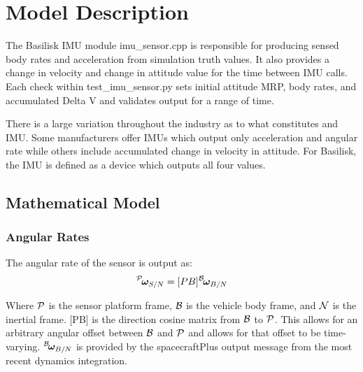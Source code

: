 \section{Model Description}
The Basilisk IMU module imu\_sensor.cpp is responsible for producing sensed body rates and acceleration from simulation truth values. It also provides a change in velocity and change in attitude value for the time between IMU calls. Each check within test\_imu\_sensor.py sets initial attitude MRP, body rates, and accumulated Delta V and validates output for a range of time.

There is a large variation throughout the industry as to what constitutes and IMU.  Some manufacturers offer IMUs which output only acceleration and angular rate while others include accumulated change in velocity in attitude. For Basilisk, the IMU is defined as a device which outputs all four values.

\subsection{Mathematical Model}

\subsubsection{Angular Rates}
The angular rate of the sensor is output as:
\begin{equation}
	 \leftexp{P}{\bm{\omega}_{S/N}} = [PB] \leftexp{B}{\bm{\omega}_{B/N}}
\end{equation}

Where $\cal{P}$ is the sensor platform frame, $\cal{B}$ is the vehicle body frame, and $\cal{N}$ is the inertial frame. [PB] is the direction cosine matrix from $\cal{B}$ to $\cal{P}$. This allows for an arbitrary angular offset between $\cal{B}$ and $\cal{P}$ and allows for that offset to be time-varying. $\leftexp{B}{\bm{\omega}_{B/N}}$ is provided by the spacecraftPlus output message from the most recent dynamics integration.

